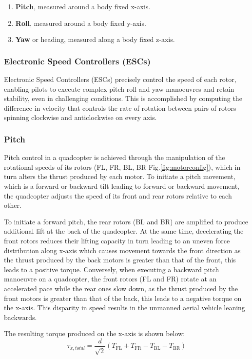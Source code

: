 \documentclass{article}
\begin{document}
\begin{enumerate}
  \item \textbf{Pitch}, measured around a body fixed x-axis.
  \item \textbf{Roll}, measured around a body fixed y-axis.
  \item \textbf{Yaw} or heading, measured along a body fixed z-axis.
\end{enumerate}

\subsubsection{Electronic Speed Controllers (ESCs)}
Electronic Speed Controllers (ESCs) precisely control the speed of each rotor,
enabling pilots to execute complex pitch roll and yaw manoeuvres and retain
stability, even in challenging conditions. This is accomplished by computing the
difference in velocity that controls the rate of rotation between pairs of
rotors spinning clockwise and anticlockwise on every axis.

\subsubsection{Pitch}
Pitch control in a quadcopter is achieved through the manipulation of the
rotational speeds of its rotors (FL, FR, BL, BR Fig.\ref{fig:motorconfig}),
which in turn alters the thrust produced by each motor. To initiate a pitch
movement, which is a forward or backward tilt leading to forward or backward
movement, the quadcopter adjusts the speed of its front and rear rotors relative
to each other. 

To initiate a forward pitch, the rear rotors (BL and BR) are amplified to
produce additional lift at the back of the quadcopter. At the same time,
decelerating the front rotors reduces their lifting capacity in turn leading to
an uneven force distribution along x-axis which causes movement towards the
front direction as the thrust produced by the back motors is greater than that
of the front, this leads to a positive torque. Conversely, when executing a
backward pitch manoeuvre on a quadcopter, the front rotors (FL and FR) rotate at
an accelerated pace while the rear ones slow down, as the thrust produced by the
front motors is greater than that of the back, this leads to a negative torque
on the x-axis. This disparity in speed results in the unmanned aerial vehicle
leaning backwards.

The resulting torque produced on the x-axis is shown below:
\begin{equation}
  \tau_{x, total} = \frac{d}{\sqrt{2}} (T_{\text{FL}} + T_{\text{FR}} - T_{\text{BL}} - T_{\text{BR}})
  \label{torque_x}
\end{equation}
\end{document}

